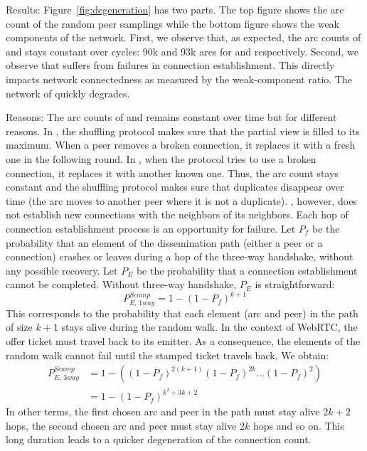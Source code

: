 \begin{asparadesc}
\item[Results:] Figure~\ref{fig:degeneration} has two parts. The top
  figure shows the arc count of the random peer samplings while the
  bottom figure shows the weak components of the network.  First, we
  observe that, as expected, the arc counts of \CYCLON and \SPRAY
  stays constant over cycles: 90k and 93k arcs for \CYCLON and \SPRAY
  respectively. Second, we observe that \SCAMP suffers from failures
  in connection establishment. This directly impacts network
  connectedness as measured by the weak-component ratio. The network
  of \SCAMP quickly degrades.
\item[Reasons:] The arc counts of \CYCLON and \SPRAY remains constant
  over time but for different reasons. In \CYCLON, the shuffling
  protocol makes sure that the partial view is filled to its
  maximum. When a peer removes a broken connection, it replaces it
  with a fresh one in the following round.  In \SPRAY, when the
  protocol tries to use a broken connection, it replaces it with
  another known one. Thus, the arc count stays constant and the
  shuffling protocol makes sure that duplicates disappear over time
  (the arc moves to another peer where it is not a duplicate).
  \SCAMP, however, does not establish new connections with the
  neighbors of its neighbors.  Each hop of connection establishment
  process is an opportunity for failure.  Let $P_f$ be the probability
  that an element of the dissemination path (either a peer or a
  connection) crashes or leaves during a hop of the three-way
  handshake, without any possible recovery. Let $P_E$ be the
  probability that a connection establishment cannot be
  completed. Without three-way handshake, $P_E$ is straightforward:
  \begin{equation} P_{E,\,1way}^{Scamp}=1-(1-
    P_f)^{k+1} \end{equation} This corresponds to the probability that
  each element (arc and peer) in the path of size $k+1$ stays alive
  during the random walk. In the context of WebRTC, the offer ticket
  must travel back to its emitter. As a consequence, the elements of
  the random walk cannot fail until the stamped ticket travels
  back. We obtain:
  \begin{align} P_{E,\,3way}^{Scamp} &=1 - ((1-P_f)^{2(k+1)} (1-P_f)^{2k}
                                       \ldots (1-P_f)^2) \nonumber \\
                                     &=1-(1-P_f)^{k^2+3k+2}
  \end{align}
  In other terms, the first chosen arc and peer in the path must stay
  alive $2k+2$ hops, the second chosen arc and peer must stay alive
  $2k$ hops and so on.  This long duration leads to a quicker
  degeneration of the connection count.


\end{asparadesc}
